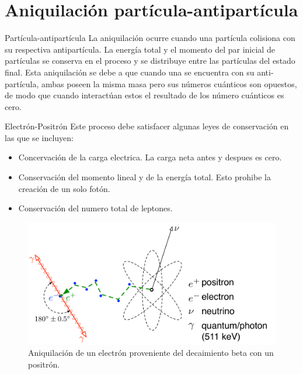 \documentclass{beamer}
\begin{document}

\section{Aniquilaci\'on part\'icula-antipart\'icula}
\begin{frame}{Part\'icula-antipart\'icula}
    La aniquilaci\'on ocurre cuando una part\'icula colisiona con su respectiva antipart\'icula. La energ\'ia total y el momento del par inicial de part\'iculas se conserva en el proceso y se distribuye entre las part\'iculas del estado final.
    Esta aniquilación se debe a que cuando una se encuentra con su anti-partícula, ambas poseen la misma masa pero sus números cuánticos son opuestos, de modo que cuando interactúan estos el resultado de los número cuánticos es cero.
\end{frame}{}
\begin{frame}{Electr\'on-Positr\'on}
    Este proceso debe satisfacer algunas leyes de conservaci\'on en las que se incluyen:
    \begin{itemize}
        \item Concervaci\'on de la carga electrica. La carga neta antes y despues es cero.
        \item Conservaci\'on del momento lineal y de la energ\'ia total. Esto prohibe la creaci\'on de un solo fot\'on.
        \item Conservaci\'on del numero total de leptones.
    \end{itemize}
    \begin{figure}[h]
        \centering
        \includegraphics[scale = 0.6]{aniquilacion-par.png}
        \caption{Aniquilaci\'on de un electr\'on proveniente del decaimiento beta con un positr\'on.}
        \label{fig:A-natural}
    \end{figure}

\end{frame}
\end{document}
